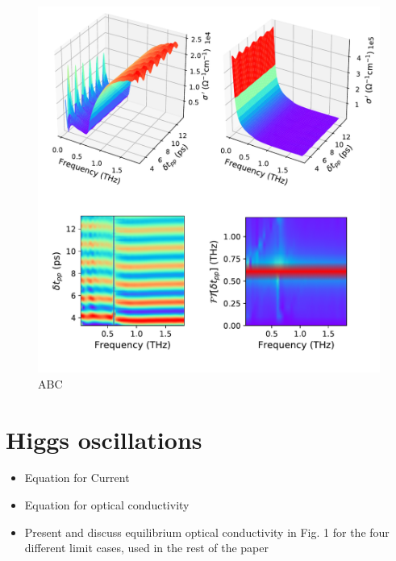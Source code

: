 \documentclass[aps,prb,reprint,noeprint,superscriptaddress]{revtex4-2}
\begin{document}
\begin{figure}[ht]
	\centering
	\includegraphics[width=\columnwidth]{figures/fig3.pdf}
	\caption{ABC}
\end{figure}
\section{Higgs oscillations}
\label{sec:higgs_oscillations}

\begin{itemize}
	\item Equation for Current
	\item Equation for optical conductivity
	\item Present and discuss equilibrium optical conductivity in Fig. 1 for the four different limit cases, used in the rest of the paper
\end{itemize}
\end{document}

